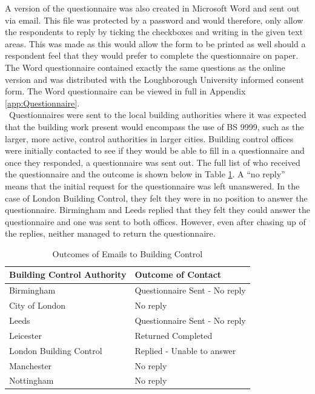 \documentclass[table,a4paper,oneside]{book}
\begin{document}
A version of the questionnaire was also created in Microsoft Word and sent out via email. This file was protected by a password and would therefore, only allow the respondents to reply by ticking the checkboxes and writing in the given text areas. This was made as this would allow the form to be printed as well should a respondent feel that they would prefer to complete the questionnaire on paper. The Word questionnaire contained exactly the same questions as the online version and was distributed with the Loughborough University informed consent form. The Word questionnaire can be viewed in full in Appendix \ref{app:Questionnaire}.
\\
\
Questionnaires were sent to the local building authorities where it was expected that the building work present would encompass the use of BS 9999, such as the larger, more active, control authorities in larger cities. Building control offices were initially contacted to see if they would be able to fill in a questionnaire and once they responded, a questionnaire was sent out. The full list of who received the questionnaire and the outcome is shown below in Table \ref{tab:Build_Auth}. A ``no reply'' means that the initial request for the questionnaire was left unanswered. In the case of London Building Control, they felt they were in no position to answer the questionnaire. Birmingham and Leeds replied that they felt they could answer the questionnaire and one was sent to both offices. However, even after chasing up of the replies, neither managed to return the questionnaire.

\begin{table}[htbp]
	\begin{center}
	\begin{tabular}{ll}
		\toprule
		\textbf{Building Control Authority} & \textbf{Outcome of Contact} \\
		\midrule
		Birmingham	& Questionnaire Sent - No reply \\
		City of London 	& No reply \\
		Leeds	& Questionnaire Sent - No reply \\
		Leicester & Returned Completed \\
		London Building Control	& Replied - Unable to answer \\
		Manchester	& No reply \\
		Nottingham	& No reply	\\
		\bottomrule
	\end{tabular}
	\end{center}
\caption{Outcomes of Emails to Building Control}
\label{tab:Build_Auth}
\end{table}
\end{document}

